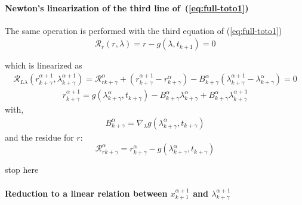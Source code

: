  \paragraph{Newton's linearization of the third  line of~(\ref{eq:full-toto1})}
The same operation is performed with the third equation of (\ref{eq:full-toto1})
\begin{equation}
  \begin{array}{l}
    \mathcal R_r(r,\lambda)=r-g(\lambda,t_{k+1}) =0\\ \\  \end{array}
\end{equation}
which is linearized as
\begin{equation}
  \label{eq:full-NL9}
  \begin{array}{l}
      \mathcal R_{L\lambda}(r^{\alpha+1}_{k+\gamma},\lambda^{\alpha+1}_{k+\gamma}) = \mathcal
      R_{rk+\gamma}^{\alpha} + (r^{\alpha+1}_{k+\gamma} - r^{\alpha}_{k+\gamma}) - B^{\alpha}_{k+\gamma}(\lambda^{\alpha+1}_{k+\gamma} -
      \lambda^{\alpha}_{k+\gamma})=0
    \end{array}
  \end{equation}
\begin{equation}
  \label{eq:full-rrL}
  \begin{array}{l}
    \boxed{r^{\alpha+1}_{k+\gamma} = g(\lambda ^{\alpha}_{k+\gamma},t_{k+\gamma}) -B^{\alpha}_{k+\gamma}
      \lambda^{\alpha}_{k+\gamma} + B^{\alpha}_{k+\gamma} \lambda^{\alpha+1}_{k+\gamma}}       
  \end{array}
\end{equation}
with,
\begin{equation}
     \begin{array}{l}
  B^{\alpha}_{k+\gamma} = \nabla_{\lambda}g(\lambda ^{\alpha}_{k+\gamma},t_{k+\gamma})
 \end{array}
\end{equation}
and the  residue for $r$:
\begin{equation}
\boxed{\mathcal
      R_{rk+\gamma}^{\alpha} = r^{\alpha}_{k+\gamma} - g(\lambda ^{\alpha}_{k+\gamma},t_{k+\gamma})}
  \end{equation}
  \begin{ndrva}
    stop here

  \end{ndrva}

\paragraph{Reduction to a linear relation between  $x^{\alpha+1}_{k+1}$ and
$\lambda^{\alpha+1}_{k+\gamma}$}

